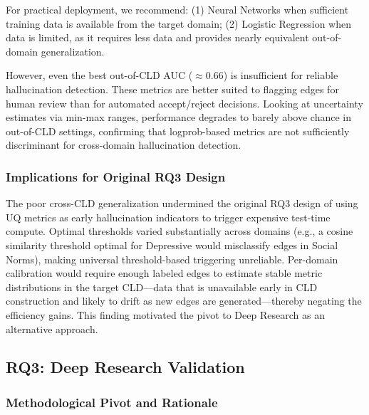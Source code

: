 For practical deployment, we recommend: (1) Neural Networks when sufficient training data is available from the target domain; (2) Logistic Regression when data is limited, as it requires less data and provides nearly equivalent out-of-domain generalization.

However, even the best out-of-CLD AUC ($\approx$0.66) is insufficient for reliable hallucination detection. These metrics are better suited to flagging edges for human review than for automated accept/reject decisions. Looking at uncertainty estimates via min-max ranges, performance degrades to barely above chance in out-of-CLD settings, confirming that logprob-based metrics are not sufficiently discriminant for cross-domain hallucination detection.

\subsubsection{Implications for Original RQ3 Design}

The poor cross-CLD generalization undermined the original RQ3 design of using UQ metrics as early hallucination indicators to trigger expensive test-time compute. Optimal thresholds varied substantially across domains (e.g., a cosine similarity threshold optimal for Depressive would misclassify edges in Social Norms), making universal threshold-based triggering unreliable. Per-domain calibration would require enough labeled edges to estimate stable metric distributions in the target CLD---data that is unavailable early in CLD construction and likely to drift as new edges are generated---thereby negating the efficiency gains. This finding motivated the pivot to Deep Research as an alternative approach.

\subsection{RQ3: Deep Research Validation}
\label{sec:discussion_rq3}
\label{sec:rq3_pivot}

\subsubsection{Methodological Pivot and Rationale}

